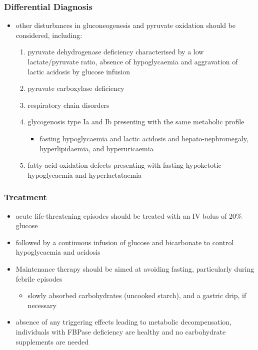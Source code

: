 \documentclass{scrartcl}
\begin{document}
\subsubsection{Differential Diagnosis}
\label{sec:org1af0584}
\begin{itemize}
\item other disturbances in gluconeogenesis and pyruvate oxidation should be considered, including:
\begin{enumerate}
\item pyruvate dehydrogenase deficiency characterised by a low
lactate/pyruvate ratio, absence of hypoglycaemia and aggravation
of lactic acidosis by glucose infusion
\item pyruvate carboxylase deficiency
\item respiratory chain disorders
\item glycogenosis type Ia and Ib presenting with the same metabolic profile
\begin{itemize}
\item fasting hypoglycaemia and lactic acidosis and hepato-nephromegaly, hyperlipidaemia, and hyperuricaemia
\end{itemize}
\item fatty acid oxidation defects presenting with fasting hypoketotic hypoglycaemia and hyperlactataemia
\end{enumerate}
\end{itemize}

\subsubsection{Treatment}
\label{sec:orgfd711b2}

\begin{itemize}
\item acute life-threatening episodes should be treated with an IV bolus
of 20\% glucose
\item followed by a continuous infusion of glucose and bicarbonate to
control hypoglycaemia and acidosis
\item Maintenance therapy should be aimed at avoiding fasting,
particularly during febrile episodes
\begin{itemize}
\item slowly absorbed carbohydrates (uncooked starch), and a gastric
drip, if necessary
\end{itemize}
\item absence of any triggering effects leading to metabolic
decompensation, individuals with FBPase deficiency are healthy and
no carbohydrate supplements are needed
\end{itemize}
\end{document}
